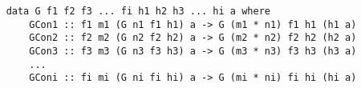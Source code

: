 \begin{verbatim}
    data G f1 f2 f3 ... fi h1 h2 h3 ... hi a where
        GCon1 :: f1 m1 (G n1 f1 h1) a -> G (m1 * n1) f1 h1 (h1 a)
        GCon2 :: f2 m2 (G n2 f2 h2) a -> G (m2 * n2) f2 h2 (h2 a)
        GCon3 :: f3 m3 (G n3 f3 h3) a -> G (m3 * n3) f3 h3 (h3 a)
        ...
        GConi :: fi mi (G ni fi hi) a -> G (mi * ni) fi hi (hi a)
\end{verbatim} 
